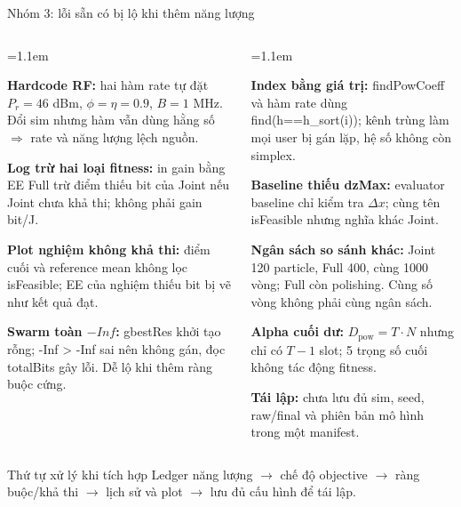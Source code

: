 \documentclass[t,aspectratio=169]{beamer}
\newcommand{\hb}[1]{{\color{hustprimary}\textbf{#1}}}
\newcommand{\code}[1]{{\small\ttfamily #1}}
\begin{document}
\begin{frame}{Nhóm 3: lỗi sẵn có bị lộ khi thêm năng lượng}
  \fontsize{8}{9.4}\selectfont
  \begin{columns}[T]
  \begin{list}{}{\leftmargin=1.1em\itemsep=3pt\parsep=0pt\topsep=0pt}
    \item \hb{Hardcode RF:} hai hàm rate tự đặt $P_r=46$ dBm, $\phi=\eta=0.9$, $B=1$ MHz. Đổi \code{sim} nhưng hàm vẫn dùng hằng số $\Rightarrow$ rate và năng lượng lệch nguồn.
    \item \hb{Log trừ hai loại fitness:} in gain bằng EE Full trừ điểm thiếu bit của Joint nếu Joint chưa khả thi; không phải gain bit/J.
    \item \hb{Plot nghiệm không khả thi:} điểm cuối và reference mean không lọc \code{isFeasible}; EE của nghiệm thiếu bit bị vẽ như kết quả đạt.
    \item \hb{Swarm toàn $-Inf$:} \code{gbestRes} khởi tạo rỗng; \code{-Inf > -Inf} sai nên không gán, đọc \code{totalBits} gây lỗi. Dễ lộ khi thêm ràng buộc cứng.
  \end{list}
  \begin{list}{}{\leftmargin=1.1em\itemsep=3pt\parsep=0pt\topsep=0pt}
    \item \hb{Index bằng giá trị:} \code{findPowCoeff} và hàm rate dùng \code{find(h==h\_sort(i))}; kênh trùng làm mọi user bị gán lặp, hệ số không còn simplex.
    \item \hb{Baseline thiếu \code{dzMax}:} evaluator baseline chỉ kiểm tra $\Delta x$; cùng tên \code{isFeasible} nhưng nghĩa khác Joint.
    \item \hb{Ngân sách so sánh khác:} Joint 120 particle, Full 400, cùng 1000 vòng; Full còn polishing. Cùng số vòng không phải cùng ngân sách.
    \item \hb{Alpha cuối dư:} $D_{\mathrm{pow}}=T\cdot N$ nhưng chỉ có $T-1$ slot; 5 trọng số cuối không tác động fitness.
    \item \hb{Tái lập:} chưa lưu đủ \code{sim}, seed, raw/final và phiên bản mô hình trong một manifest.
  \end{list}
  \end{columns}
  \vspace{-5pt}
  \begin{block}{Thứ tự xử lý khi tích hợp}\scriptsize
  Ledger năng lượng $\rightarrow$ chế độ objective $\rightarrow$ ràng buộc/khả thi $\rightarrow$ lịch sử và plot $\rightarrow$ lưu đủ cấu hình để tái lập.
  \end{block}
\end{frame}
\end{document}
